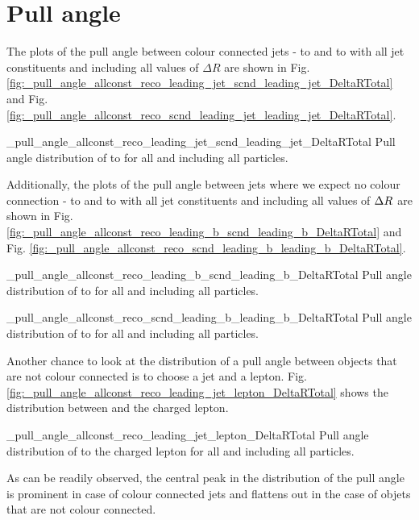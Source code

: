 \section{Pull angle}

The plots of the pull angle between colour connected jets - \leadingjet to \scndleadingjet and \scndleadingjet to \leadingjet with all jet constituents and including all values of $\Delta R$ are shown in Fig. \ref{fig:_pull_angle_allconst_reco_leading_jet_scnd_leading_jet_DeltaRTotal} and Fig. \ref{fig:_pull_angle_allconst_reco_scnd_leading_jet_leading_jet_DeltaRTotal}.

          {_pull_angle_allconst_reco_leading_jet_scnd_leading_jet_DeltaRTotal}
          {Pull angle distribution of \leadingjet to \scndleadingjet for all \DeltaR and including all particles.}


Additionally, the plots of the pull angle between jets where we expect no colour connection - \leadingb to \scndleadingb and \scndleadingb to \leadingb with all jet constituents and including all values of $\Delta R^{} $ are shown in Fig. \ref{fig:_pull_angle_allconst_reco_leading_b_scnd_leading_b_DeltaRTotal} and Fig. \ref{fig:_pull_angle_allconst_reco_scnd_leading_b_leading_b_DeltaRTotal}.

          {_pull_angle_allconst_reco_leading_b_scnd_leading_b_DeltaRTotal}
          {Pull angle distribution of \leadingb to \scndleadingb for all \DeltaR and including all particles.}

          {_pull_angle_allconst_reco_scnd_leading_b_leading_b_DeltaRTotal}
          {Pull angle distribution of \scndleadingb to \leadingb for all \DeltaR and including all particles.}


Another chance to look at the distribution of a pull angle between objects that are not colour connected is to choose a jet and a lepton. Fig. \ref{fig:_pull_angle_allconst_reco_leading_jet_lepton_DeltaRTotal} shows the distribution between \leadingjet and the charged lepton. 

          {_pull_angle_allconst_reco_leading_jet_lepton_DeltaRTotal}
          {Pull angle distribution of \leadingjet to the charged lepton for all \DeltaR and including all particles.}

As can be readily observed, the central peak in the distribution of the pull angle is prominent in case of colour connected jets and flattens out in the case of objets that are not colour connected.

